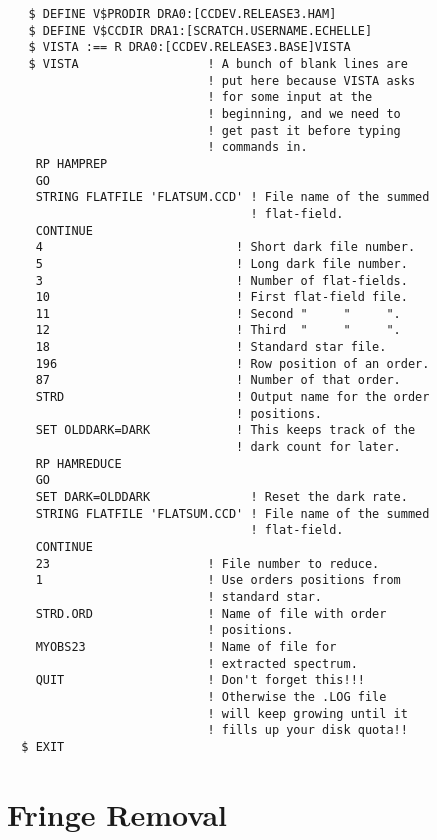 \begin{verbatim}
   $ DEFINE V$PRODIR DRA0:[CCDEV.RELEASE3.HAM]
   $ DEFINE V$CCDIR DRA1:[SCRATCH.USERNAME.ECHELLE]
   $ VISTA :== R DRA0:[CCDEV.RELEASE3.BASE]VISTA
   $ VISTA                  ! A bunch of blank lines are
                            ! put here because VISTA asks
                            ! for some input at the
                            ! beginning, and we need to
                            ! get past it before typing
                            ! commands in.
    RP HAMPREP
    GO
    STRING FLATFILE 'FLATSUM.CCD' ! File name of the summed
                                  ! flat-field.
    CONTINUE
    4                           ! Short dark file number.
    5                           ! Long dark file number.
    3                           ! Number of flat-fields.
    10                          ! First flat-field file.
    11                          ! Second "     "     ".
    12                          ! Third  "     "     ".
    18                          ! Standard star file.
    196                         ! Row position of an order.
    87                          ! Number of that order.
    STRD                        ! Output name for the order
                                ! positions.
    SET OLDDARK=DARK            ! This keeps track of the
                                ! dark count for later.
    RP HAMREDUCE
    GO
    SET DARK=OLDDARK              ! Reset the dark rate.
    STRING FLATFILE 'FLATSUM.CCD' ! File name of the summed
                                  ! flat-field.
    CONTINUE
    23                      ! File number to reduce.
    1                       ! Use orders positions from
                            ! standard star.
    STRD.ORD                ! Name of file with order
                            ! positions.
    MYOBS23                 ! Name of file for
                            ! extracted spectrum.
    QUIT                    ! Don't forget this!!!
                            ! Otherwise the .LOG file
                            ! will keep growing until it
                            ! fills up your disk quota!!
  $ EXIT
\end{verbatim}


\section{Fringe Removal}
\label{sec:hamfringe}


